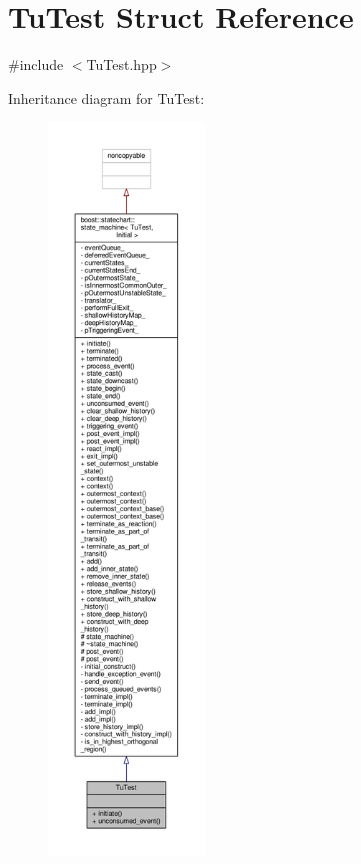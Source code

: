 \hypertarget{struct_tu_test}{}\section{Tu\+Test Struct Reference}
\label{struct_tu_test}


{\ttfamily \#include $<$Tu\+Test.\+hpp$>$}



Inheritance diagram for Tu\+Test\+:
\nopagebreak
\begin{figure}[H]
\begin{center}
\leavevmode
\includegraphics[height=550pt]{struct_tu_test__inherit__graph}
\end{center}
\end{figure}


